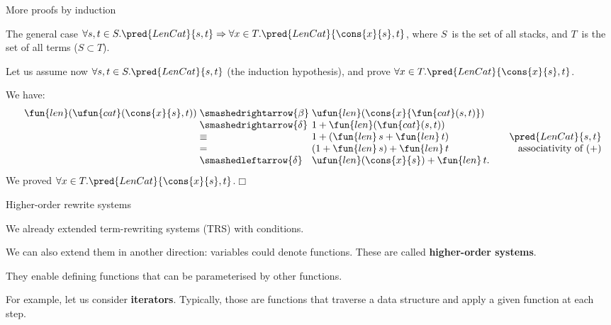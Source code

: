 %
\begin{frame}{More proofs by induction}

  The general case \(\forall s,t \in S.\pred{LenCat}{s,t} \Rightarrow
  \forall x \in T.\pred{LenCat}{\cons{x}{s}, t}\), where \(S\)~is the
  set of all stacks, and \(T\)~is the set of all terms (\(S \subset
  T\)).

  \bigskip

  Let us assume now \(\forall s,t \in S.\pred{LenCat}{s,t}\) (the
  induction hypothesis), and prove \(\forall x \in
  T.\pred{LenCat}{\cons{x}{s}, t}\).

  \bigskip

  We have:
  \begin{equation*}
    \begin{array}{r@{\;}l@{\;}l@{\qquad}r@{}}
        \fun{len}(\ufun{cat}(\cons{x}{s},t))
      & \smashedrightarrow{\beta}
      & \ufun{len}(\cons{x}{\fun{cat}(s,t)})\\
      & \smashedrightarrow{\delta}
      & 1 + \fun{len}(\fun{cat}(s,t))\\
      & \equiv & 1 + (\fun{len}\,s + \fun{len}\,t)
      & \pred{LenCat}{s,t}\\
      & = & (1 + \fun{len}\,s) + \fun{len}\,t
      & \text{associativity of \((+)\)}\\
      & \smashedleftarrow{\delta}
      & \ufun{len}(\cons{x}{s}) + \fun{len}\,t.
    \end{array}
  \end{equation*}
  We proved \(\forall x \in T.\pred{LenCat}{\cons{x}{s}, t}\).\hfill\(\Box\)

\end{frame}

%
\begin{frame}{Higher-order rewrite systems}

  We already extended term-rewriting systems (TRS) with conditions.

  \bigskip

  We can also extend them in another direction: variables could denote
  functions. These are called \textbf{higher\hyp{}order systems}.

  \bigskip

  They enable defining functions that can be parameterised by other
  functions.

  \bigskip

  For example, let us consider \textbf{iterators}. Typically, those
  are functions that traverse a data structure and apply a given
  function at each step.

\end{frame}

